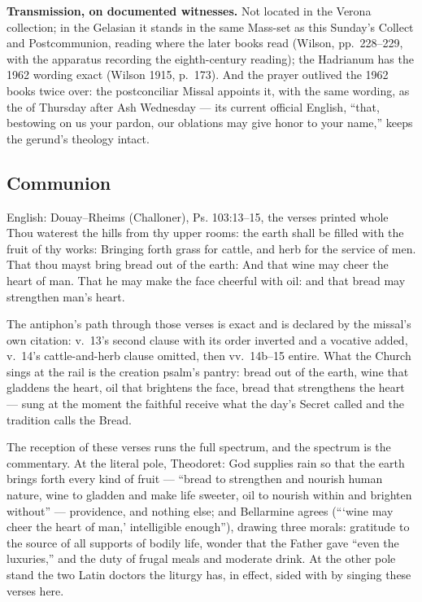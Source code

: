 \textbf{Transmission, on documented witnesses.} Not located in the Verona
collection; in the Gelasian it stands in the same Mass-set as this Sunday's
Collect and Postcommunion, reading  where the later books
read  (Wilson, pp.~228--229, with the apparatus recording
the eighth-century reading); the Hadrianum has the 1962 wording exact
(Wilson 1915, p.~173). And the prayer outlived the 1962 books twice over:
the postconciliar Missal appoints it, with the same wording, as the
 of Thursday after Ash Wednesday --- its current
official English, ``that, bestowing on us your pardon, our oblations may
give honor to your name,'' keeps the gerund's theology intact.

\elementguard
\subsection*{Communion }


\begin{namedtranslation}{English: Douay--Rheims (Challoner), Ps. 103:13--15, the verses printed whole}
Thou waterest the hills from thy upper rooms: the earth shall be filled with
the fruit of thy works: Bringing forth grass for cattle, and herb for the
service of men. That thou mayst bring bread out of the earth: And that wine
may cheer the heart of man. That he may make the face cheerful with oil: and
that bread may strengthen man's heart.
\end{namedtranslation}

The antiphon's path through those verses is exact and is declared by the
missal's own citation: v.~13's second clause with its order inverted and a
vocative added, v.~14's cattle-and-herb clause omitted, then vv.~14b--15
entire. What the Church sings at the rail is the creation psalm's pantry:
bread out of the earth, wine that gladdens the heart, oil that brightens the
face, bread that strengthens the heart --- sung at the moment the faithful
receive what the day's Secret called  and the tradition calls
the Bread.

The reception of these verses runs the full spectrum, and the spectrum is
the commentary. At the literal pole, Theodoret: God supplies rain so that
the earth brings forth every kind of fruit --- ``bread to strengthen and
nourish human nature, wine to gladden and make life sweeter, oil to nourish
within and brighten without'' --- providence, and nothing else; and
Bellarmine agrees (``\thinspace`wine may cheer the heart of man,'
intelligible enough''), drawing three morals: gratitude to the source of all
supports of bodily life, wonder that the Father gave ``even the luxuries,''
and the duty of frugal meals and moderate drink. At the other pole stand the
two Latin doctors the liturgy has, in effect, sided with by singing these
verses here.

